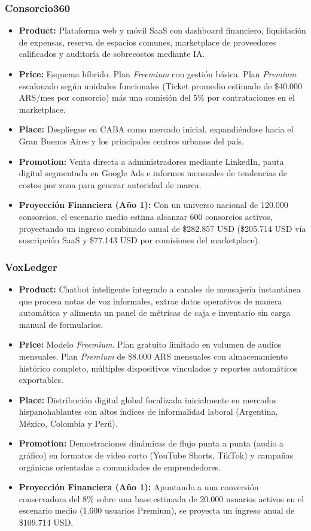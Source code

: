 \subsubsection{Consorcio360}
\begin{itemize}
    \item \textbf{Product:} Plataforma web y móvil SaaS con dashboard financiero, liquidación de expensas, reserva de espacios comunes, marketplace de proveedores calificados y auditoría de sobrecostos mediante IA.
    \item \textbf{Price:} Esquema híbrido. Plan \textit{Freemium} con gestión básica. Plan \textit{Premium} escalonado según unidades funcionales (Ticket promedio estimado de \$40.000 ARS/mes por consorcio) más una comisión del 5\% por contrataciones en el marketplace.
    \item \textbf{Place:} Despliegue en CABA como mercado inicial, expandiéndose hacia el Gran Buenos Aires y los principales centros urbanos del país.
    \item \textbf{Promotion:} Venta directa a administradores mediante LinkedIn, pauta digital segmentada en Google Ads e informes mensuales de tendencias de costos por zona para generar autoridad de marca.
    \item \textbf{Proyección Financiera (Año 1):} Con un universo nacional de 120.000 consorcios, el escenario medio estima alcanzar 600 consorcios activos, proyectando un ingreso combinado anual de \$282.857 USD (\$205.714 USD vía suscripción SaaS y \$77.143 USD por comisiones del marketplace).
\end{itemize}

\subsubsection{VoxLedger}
\begin{itemize}
    \item \textbf{Product:} Chatbot inteligente integrado a canales de mensajería instantánea que procesa notas de voz informales, extrae datos operativos de manera automática y alimenta un panel de métricas de caja e inventario sin carga manual de formularios.
    \item \textbf{Price:} Modelo \textit{Freemium}. Plan gratuito limitado en volumen de audios mensuales. Plan \textit{Premium} de \$8.000 ARS mensuales con almacenamiento histórico completo, múltiples dispositivos vinculados y reportes automáticos exportables.
    \item \textbf{Place:} Distribución digital global focalizada inicialmente en mercados hispanohablantes con altos índices de informalidad laboral (Argentina, México, Colombia y Perú).
    \item \textbf{Promotion:} Demostraciones dinámicas de flujo punta a punta (audio a gráfico) en formatos de video corto (YouTube Shorts, TikTok) y campañas orgánicas orientadas a comunidades de emprendedores.
    \item \textbf{Proyección Financiera (Año 1):} Apuntando a una conversión conservadora del 8\% sobre una base estimada de 20.000 usuarios activos en el escenario medio (1.600 usuarios Premium), se proyecta un ingreso anual de \$109.714 USD.
\end{itemize}

